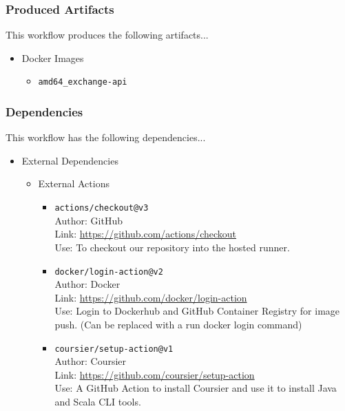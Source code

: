 \documentclass[a4paper,11pt]{article}
\begin{document}
\subsubsection{Produced Artifacts}
This workflow produces the following artifacts...
\begin{itemize}
    \item Docker Images
    \begin{itemize}
        \item\verb|amd64_exchange-api|
    \end{itemize}
\end{itemize}

\subsubsection{Dependencies}
This workflow has the following dependencies...
\begin{itemize}
    \item External Dependencies
    \begin{itemize}
        \item External Actions
        \begin{itemize}
            \item\verb|actions/checkout@v3|\\Author: GitHub\\Link: \href{https://github.com/actions/checkout}{https://github.com/actions/checkout}\\Use: To checkout our repository into the hosted runner.
            \item\verb|docker/login-action@v2|\\Author: Docker\\Link: \href{https://github.com/docker/login-action}{https://github.com/docker/login-action}\\Use: Login to Dockerhub and GitHub Container Registry for image push. (Can be replaced with a run docker login command)
            \item\verb|coursier/setup-action@v1|\\Author: Coursier\\Link: \href{https://github.com/coursier/setup-action}{https://github.com/coursier/setup-action}\\Use: A GitHub Action to install Coursier and use it to install Java and Scala CLI tools.
        \end{itemize}
    \end{itemize}
\end{itemize}
\end{document}
